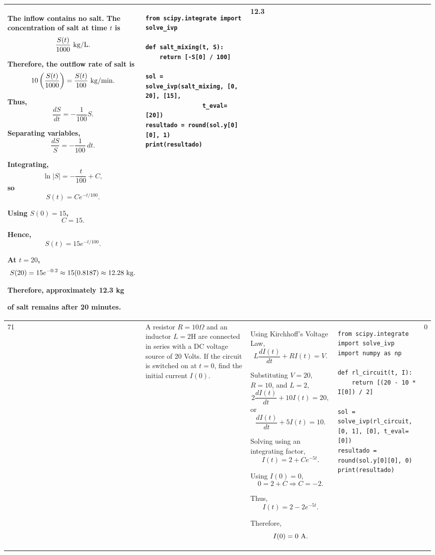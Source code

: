\documentclass[a4paper,12pt]{article}
\begin{document}
\begin{longtable}{|p{0.3cm}|p{}|p{10cm}|p{}|p{1.5cm}|}
The inflow contains no salt. The concentration of salt at time $t$ is
\[
\frac{S(t)}{1000}\ {\rm kg/L}.
\]

Therefore, the outflow rate of salt is
\[
10\left(\frac{S(t)}{1000}\right)
=\frac{S(t)}{100}\ {\rm kg/min}.
\]

Thus,
\[
\frac{dS}{dt}=-\frac{1}{100}S.
\]

Separating variables,
\[
\frac{dS}{S}=-\frac{1}{100}\,dt.
\]

Integrating,
\[
\ln|S|=-\frac{t}{100}+C,
\]
so
\[
S(t)=Ce^{-t/100}.
\]

Using $S(0)=15$,
\[
C=15.
\]

Hence,
\[
S(t)=15e^{-t/100}.
\]

At $t=20$,
\[
S(20)=15e^{-0.2}\approx15(0.8187)
\approx12.28\ {\rm kg}.
\]

Therefore, approximately
12.3 kg

of salt remains after 20 minutes.
&
\begin{verbatim}
from scipy.integrate import solve_ivp

def salt_mixing(t, S):
    return [-S[0] / 100]

sol = solve_ivp(salt_mixing, [0, 20], [15],
                t_eval=[20])
resultado = round(sol.y[0][0], 1)
print(resultado)
\end{verbatim}
&
12.3 \\
\hline

71 &
A resistor $R=10\Omega$ and an inductor $L=2$H are connected in series with a DC voltage source of 20 Volts. If the circuit is switched on at $t=0$, find the initial current $I(0)$. &
Using Kirchhoff's Voltage Law,
\[
L\frac{dI(t)}{dt}+RI(t)=V.
\]

Substituting $V=20$, $R=10$, and $L=2$,
\[
2\frac{dI(t)}{dt}+10I(t)=20,
\]
or
\[
\frac{dI(t)}{dt}+5I(t)=10.
\]

Solving using an integrating factor,
\[
I(t)=2+Ce^{-5t}.
\]

Using $I(0)=0$,
\[
0=2+C
\Rightarrow C=-2.
\]

Thus,
\[
I(t)=2-2e^{-5t}.
\]

Therefore,
\[
I(0)=0\ {\rm A}.
\]
&
\begin{verbatim}
from scipy.integrate import solve_ivp
import numpy as np

def rl_circuit(t, I):
    return [(20 - 10 * I[0]) / 2]

sol = solve_ivp(rl_circuit, [0, 1], [0], t_eval=[0])
resultado = round(sol.y[0][0], 0)
print(resultado)
\end{verbatim}
&
0 \\
\hline


\end{longtable}
\end{document}
